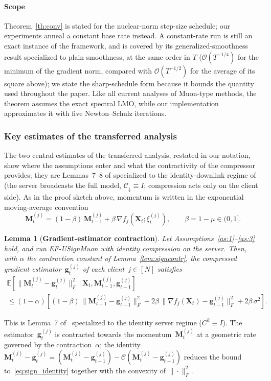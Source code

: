 \documentclass{article}
\newtheorem{lemma}{Lemma}
\begin{document}
\paragraph{Scope} Theorem~\ref{th:conv} is stated for the nuclear-norm step-size schedule; our experiments anneal a constant base rate instead. A constant-rate run is still an exact instance of the framework, and is covered by its generalized-smoothness result \citep[Theorem~24]{gruntkowska2025error} specialized to plain smoothness, at the same order in $T$ ($\mathcal{O}(T^{-1/4})$ for the minimum of the gradient norm, compared with $\mathcal{O}(T^{-1/2})$ for the average of its square above); we state the sharp-schedule form because it bounds the quantity used throughout the paper. Like all current analyses of Muon-type methods, the theorem assumes the exact spectral LMO, while our implementation approximates it with five Newton--Schulz iterations.

\subsubsection{Key estimates of the transferred analysis}

The two central estimates of the transferred analysis, restated in our notation, show where the assumptions enter and what the contractivity of the compressor provides; they are Lemmas~7--8 of \citet{gruntkowska2025error} specialized to the identity-downlink regime of  (the server broadcasts the full model, $\mathcal{C}_{\downarrow} \equiv I$; compression acts only on the client side). As in the proof sketch above, momentum is written in the exponential moving-average convention
\[
\mathbf{M}_t^{(j)} = (1-\beta)\,\mathbf{M}_{t-1}^{(j)} + \beta\,\nabla f_j(\mathbf{X}_t;\xi_t^{(j)}), \qquad \beta = 1-\mu \in(0,1].
\]

\begin{lemma}[\textbf{Gradient-estimator contraction}]\label{lem:est}
Let Assumptions~\ref{as:1}--\ref{as:3} hold, and run EF-USignMuon with identity compression on the server. Then, with $\alpha$ the contraction constant of Lemma~\ref{lem:signcontr}, the compressed gradient estimator~$\mathbf{g}_t^{(j)}$ of each client~$j\in[N]$ satisfies
\begin{multline}
\mathbb{E}\!\left[\|\mathbf{M}_t^{(j)}-\mathbf{g}_t^{(j)}\|_F^2 \,\big|\, \mathbf{X}_t,\mathbf{M}_{t-1}^{(j)},\mathbf{g}_{t-1}^{(j)}\right] \\
\le (1-\alpha)\!\left[(1-\beta)\,\|\mathbf{M}_{t-1}^{(j)}-\mathbf{g}_{t-1}^{(j)}\|_F^2 + 2\beta\,\|\nabla f_j(\mathbf{X}_t)-\mathbf{g}_{t-1}^{(j)}\|_F^2 + 2\beta\,\sigma^2\right].
\end{multline}
\end{lemma}
\noindent This is Lemma~7 of~\cite{gruntkowska2025error} specialized to the identity server regime ($C^k \equiv I$). The estimator~$\mathbf{g}_t^{(j)}$ is contracted towards the momentum~$\mathbf{M}_t^{(j)}$ at a geometric rate governed by the contraction~$\alpha$; the identity $\mathbf{M}_t^{(j)}-\mathbf{g}_t^{(j)} = (\mathbf{M}_t^{(j)}-\mathbf{g}_{t-1}^{(j)}) - \mathcal{C}(\mathbf{M}_t^{(j)}-\mathbf{g}_{t-1}^{(j)})$ reduces the bound to~\eqref{eq:sign_identity} together with the convexity of $\|\cdot\|_F^2$.
\end{document}
